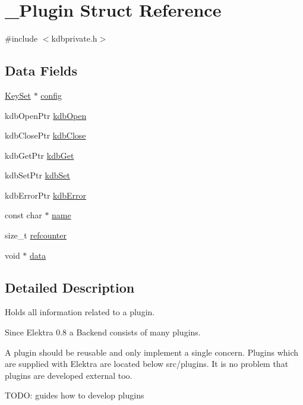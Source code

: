 \hypertarget{struct__Plugin}{
\section{\_\-Plugin Struct Reference}
\label{struct__Plugin}
}


{\ttfamily \#include $<$kdbprivate.h$>$}

\subsection*{Data Fields}
\begin{DoxyCompactItemize}
\item 
\hyperlink{struct__KeySet}{KeySet} $\ast$ \hyperlink{struct__Plugin_ab2515d2e11eec337550300d6f56a3d4b}{config}
\item 
kdbOpenPtr \hyperlink{struct__Plugin_ac9da7168ac65402b997a31a3b4a8d720}{kdbOpen}
\item 
kdbClosePtr \hyperlink{struct__Plugin_a5b0b2cc22ad5dcc7ec0eb570c2c6ff4b}{kdbClose}
\item 
kdbGetPtr \hyperlink{struct__Plugin_a0b2e0db2565e6f1d16f9b78112580a18}{kdbGet}
\item 
kdbSetPtr \hyperlink{struct__Plugin_acaa373d251ec25ff93335741ddb5b0e3}{kdbSet}
\item 
kdbErrorPtr \hyperlink{struct__Plugin_a621683acebfa6aac91c5903d8f6d653a}{kdbError}
\item 
const char $\ast$ \hyperlink{struct__Plugin_ad3ca225d725b5ae7b46754c025007a75}{name}
\item 
size\_\-t \hyperlink{struct__Plugin_a9be13e52b86cb351edd25a143d186da3}{refcounter}
\item 
void $\ast$ \hyperlink{struct__Plugin_ad2e6fd0b76939b20008e9cc046a06779}{data}
\end{DoxyCompactItemize}


\subsection{Detailed Description}
Holds all information related to a plugin.

Since Elektra 0.8 a Backend consists of many plugins.

A plugin should be reusable and only implement a single concern. Plugins which are supplied with Elektra are located below src/plugins. It is no problem that plugins are developed external too.

TODO: guides how to develop plugins 

